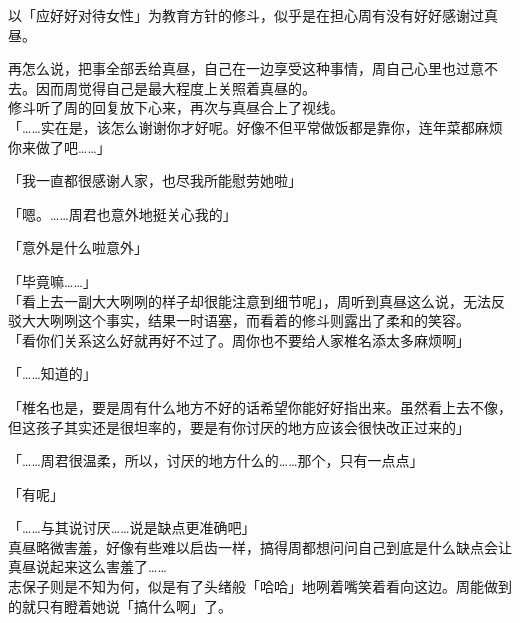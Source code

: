 以「应好好对待女性」为教育方针的修斗，似乎是在担心周有没有好好感谢过真昼。

再怎么说，把事全部丢给真昼，自己在一边享受这种事情，周自己心里也过意不去。因而周觉得自己是最大程度上关照着真昼的。\\

修斗听了周的回复放下心来，再次与真昼合上了视线。\\

「……实在是，该怎么谢谢你才好呢。好像不但平常做饭都是靠你，连年菜都麻烦你来做了吧……」

「我一直都很感谢人家，也尽我所能慰劳她啦」

「嗯。……周君也意外地挺关心我的」

「意外是什么啦意外」

「毕竟嘛……」\\

「看上去一副大大咧咧的样子却很能注意到细节呢」，周听到真昼这么说，无法反驳大大咧咧这个事实，结果一时语塞，而看着的修斗则露出了柔和的笑容。\\

「看你们关系这么好就再好不过了。周你也不要给人家椎名添太多麻烦啊」

「……知道的」

「椎名也是，要是周有什么地方不好的话希望你能好好指出来。虽然看上去不像，但这孩子其实还是很坦率的，要是有你讨厌的地方应该会很快改正过来的」

「……周君很温柔，所以，讨厌的地方什么的……那个，只有一点点」

「有呢」

「……与其说讨厌……说是缺点更准确吧」\\

真昼略微害羞，好像有些难以启齿一样，搞得周都想问问自己到底是什么缺点会让真昼说起来这么害羞了……\\

志保子则是不知为何，似是有了头绪般「哈哈」地咧着嘴笑着看向这边。周能做到的就只有瞪着她说「搞什么啊」了。
